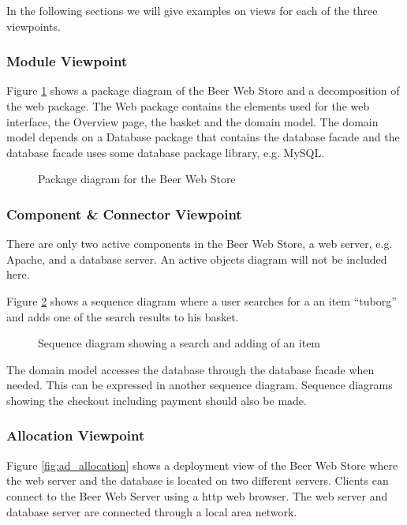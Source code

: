 In the following sections we will give examples on views for each
of the three viewpoints.

\subsubsection{Module Viewpoint}

Figure \ref{fig:ad_package} shows a package diagram of the Beer Web
Store and a decomposition of the web package. The Web package
contains the elements used for the web interface, 
the Overview page, the basket and the domain model. The domain model
depends on a Database package that contains the database facade and the
database facade uses some database package library, e.g. MySQL.

\begin{figure}[!htb]
\centerline{}
\caption{Package diagram for the Beer Web Store}
\label{fig:ad_package}
\end{figure}

\subsubsection{Component \& Connector Viewpoint}

There are only two active components in the Beer Web Store, a web server,
e.g. Apache, and a database server. An active objects diagram will
not be included here.

Figure \ref{fig:ad_sequence} shows a sequence diagram where a user searches
for a an item ``tuborg'' and adds one of the search results to his basket.

\begin{figure}[!htb]
\centerline{}
\caption{Sequence diagram showing a search and adding of an item}
\label{fig:ad_sequence}
\end{figure}

The domain model accesses the database through the database facade
when needed. This can be expressed in another sequence diagram.
Sequence diagrams showing the checkout including payment should
also be made.

\subsubsection{Allocation Viewpoint}

Figure \ref{fig:ad_allocation} shows a deployment view of the Beer
Web Store where the web server and the database is located on two
different servers. Clients can connect to the Beer Web Server
using a http web browser. The web server and database server
are connected through a local area network.

